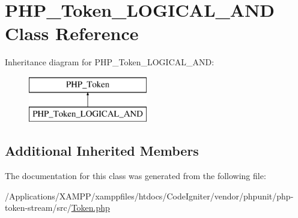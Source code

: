 \hypertarget{class_p_h_p___token___l_o_g_i_c_a_l___a_n_d}{}\section{P\+H\+P\+\_\+\+Token\+\_\+\+L\+O\+G\+I\+C\+A\+L\+\_\+\+A\+ND Class Reference}
\label{class_p_h_p___token___l_o_g_i_c_a_l___a_n_d}
Inheritance diagram for P\+H\+P\+\_\+\+Token\+\_\+\+L\+O\+G\+I\+C\+A\+L\+\_\+\+A\+ND\+:\begin{figure}[H]
\begin{center}
\leavevmode
\includegraphics[height=2.000000cm]{class_p_h_p___token___l_o_g_i_c_a_l___a_n_d}
\end{center}
\end{figure}
\subsection*{Additional Inherited Members}


The documentation for this class was generated from the following file\+:\begin{DoxyCompactItemize}
\item 
/\+Applications/\+X\+A\+M\+P\+P/xamppfiles/htdocs/\+Code\+Igniter/vendor/phpunit/php-\/token-\/stream/src/\mbox{\hyperlink{_token_8php}{Token.\+php}}\end{DoxyCompactItemize}
